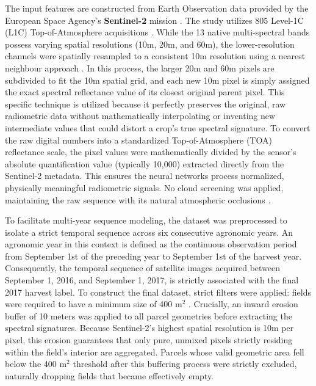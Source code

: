 The input features are constructed from Earth Observation data provided by the European Space Agency's \textbf{Sentinel-2} mission \cite{drusch_sentinel2_2012}.
The study utilizes 805 Level-1C (L1C) Top-of-Atmosphere acquisitions \cite{perantoni_bayesian_2024}.
While the 13 native multi-spectral bands possess varying spatial resolutions (10m, 20m, and 60m),
the lower-resolution channels were spatially resampled to a consistent 10m resolution using a nearest neighbour approach \cite{perantoni_bayesian_2024}.
In this process, the larger 20m and 60m pixels are subdivided to fit the 10m spatial grid,
and each new 10m pixel is simply assigned the exact spectral reflectance value of its closest original parent pixel.
This specific technique is utilized because it perfectly preserves the original, raw radiometric data
without mathematically interpolating or inventing new intermediate values that could distort a crop's true spectral signature.
To convert the raw digital numbers into a standardized Top-of-Atmosphere (TOA) reflectance scale,
the pixel values were mathematically divided by the sensor's absolute quantification value (typically 10,000) extracted directly from the Sentinel-2 metadata.
This ensures the neural networks process normalized, physically meaningful radiometric signals.
No cloud screening was applied, maintaining the raw sequence with its natural atmospheric occlusions \cite{perantoni_bayesian_2024}.

To facilitate multi-year sequence modeling, the dataset was preprocessed to isolate a strict temporal sequence across six consecutive agronomic years.
An agronomic year in this context is defined as the continuous observation period from September 1st of the preceding year to September 1st of the harvest year.
Consequently, the temporal sequence of satellite images acquired between September 1, 2016, and September 1, 2017, is strictly associated with the final 2017 harvest label.
To construct the final dataset, strict filters were applied: fields were required to have a minimum size of 400 $\text{m}^2$ \cite{perantoni_bayesian_2024}.
Crucially, an inward erosion buffer of 10 meters was applied to all parcel
geometries before extracting the spectral signatures.
Because Sentinel-2's highest spatial resolution is 10m per pixel,
this erosion guarantees that only pure, unmixed pixels strictly residing
within the field's interior are aggregated.
Parcels whose valid geometric area fell below the 400 $\text{m}^2$ threshold after this buffering
process were strictly excluded, naturally dropping fields that became effectively empty.

